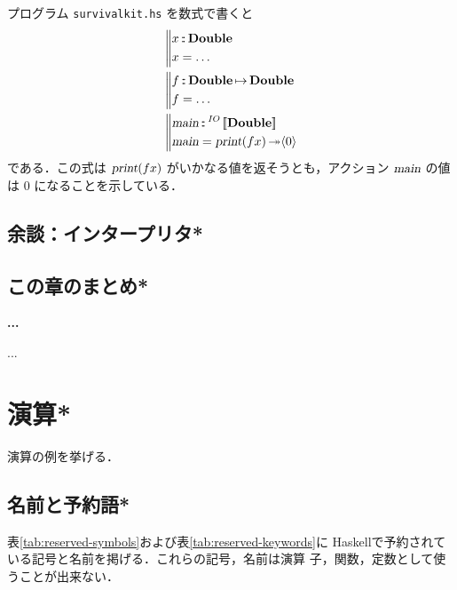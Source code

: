 \documentclass[a5paper,twoside,fleqn]{jsbook}
\def\[{\left[\!\left[}
\def\]{\right]\!\right]}
\newcommand{\programminglanguage}[1]{\textsf{#1}}
\newcommand{\haskell}{\programminglanguage{Haskell}}
\newenvironment{leader}{\begingroup\gt}{\endgroup}
\newenvironment{note}[1]{\begin{boxnote}\begin{center}\textbf{#1}\end{center}}{\end{boxnote}}
\newcommand{\filename}[1]{\texttt{#1}}
\newcommand{\mBrace}{\Vert}
\newcommand{\mAction}[1]{\textsl{#1}}
\DeclareMathOperator{\mMain}{\mAction{main}}
\DeclareMathOperator{\mPrint}{\mAction{print}}
\DeclareMathOperator{\mBindRightIgnore}{\twoheadrightarrow}
\DeclareMathOperator{\mIn}{{:\!:}}
\DeclareMathOperator{\mMapsTo}{\mapsto}
\newcommand{\mType}[1]{\mathbf{#1}}
\newcommand{\mDoubleType}{\mType{Double}}
\newcommand{\mGenericTypeAssemble}[2]{{}^{\mTypeConstructor{#1}}\[\mType{#2}\]}
\newcommand{\mIOType}[1]{\mGenericTypeAssemble{IO}{#1}}
\newcommand{\mIODoubleType}{\mIOType{\mDoubleType}}
\newcommand{\mTypeConstructor}[1]{\textit{#1}}
\newcommand{\mPureWith}[1]{\langle#1\rangle}
\newcommand{\mProj}[2]{#1\mMapsTo#2}
\begin{document}
プログラム \filename{survivalkit.hs} を数式で書くと
\begin{align}
  {}&\left\mBrace
    \begin{aligned}
      x&\mIn\mDoubleType\\
      x&=\dots\\
    \end{aligned}
    \right.\\
  {}&\left\mBrace
    \begin{aligned}
      f&\mIn{}\mProj{\mDoubleType}{\mDoubleType}\\
      f&=\dots\\
    \end{aligned}
    \right.\\
  {}&\left\mBrace
    \begin{aligned}
      \mMain&\mIn{}\mIODoubleType\\
      \mMain&=\mPrint(fx)\mBindRightIgnore\mPureWith{0}
    \end{aligned}
    \right.
\end{align}
である．この式は $\mPrint(fx)$ がいかなる値を返そうとも，アクション
$\mMain$ の値は $0$ になることを示している．

\section{余談：インタープリタ*}

\section{この章のまとめ*}

\begin{note}{...}
...
\end{note}

\chapter{演算*}

\begin{leader}
演算の例を挙げる．
\end{leader}


\section{名前と予約語*}

表\ref{tab:reserved-symbols}および表\ref{tab:reserved-keywords}に
\haskell で予約されている記号と名前を掲げる．これらの記号，名前は演算
子，関数，定数として使うことが出来ない．
\end{document}
